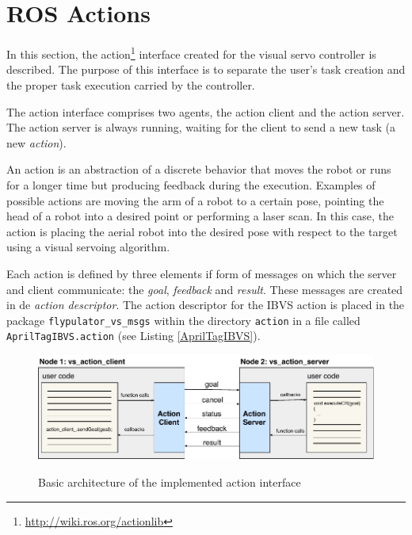 \section{ROS Actions}
\label{sec:ros_actions}

In this section, the action\footnote{\url{http://wiki.ros.org/actionlib}} interface created for the visual servo controller is described. The purpose of this interface is to separate the user's task creation and the proper task execution carried  by the controller.

The action interface comprises two agents, the action client and the action server. The action server is always running, waiting for the client to send a new task (a new \emph{action}).

An action \cite{ROS_ComPat} is an abstraction of a discrete behavior that moves the robot or runs for a longer time but producing feedback during the execution. Examples of possible actions are moving the arm of a robot to a certain pose, pointing the head of a robot into a desired point or performing a laser scan. In this case, the action is placing the aerial robot into the desired pose with respect to the target using a visual servoing algorithm.

 Each action is defined by three elements if form of messages on which the server and client communicate: the \emph{goal}, \emph{feedback} and \emph{result}. These messages are created in de \emph{action descriptor}. The action descriptor for the IBVS action is placed in the package \texttt{flypulator\_vs\_msgs} within the directory \texttt{action} in a file called \texttt{AprilTagIBVS.action} (see Listing \ref{AprilTagIBVS}).


\begin{figure}[!htb]
	\caption{Basic architecture of the implemented action interface}
	\centering
	\includegraphics[width=\textwidth]{content/chapter_05/images/action_interface.pdf}
	\label{fig:action_interface}
\end{figure}